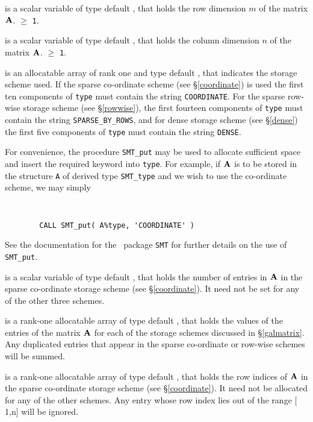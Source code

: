 \documentclass{galahad}
\begin{document}
\begin{description}

 is a scalar variable of type default \integer, that holds
the row dimension $m$ of the matrix  ${\mathbf{A}}$. 
 $\geq$ {\tt 1}. 

 is a scalar variable of type default \integer, that holds
the column dimension $n$ of the matrix  ${\mathbf{A}}$. 
 $\geq$ {\tt 1}. 

 is an allocatable array of rank one and type default \character, that
indicates the storage scheme used. If the 
sparse co-ordinate scheme (see \S\ref{coordinate}) is used
the first ten components of {\tt type} must contain the
string {\tt COORDINATE}.
For the sparse row-wise storage scheme (see \S\ref{rowwise}),
the first fourteen components of {\tt type} must contain the
string {\tt SPARSE\_BY\_ROWS}, and
for dense storage scheme (see \S\ref{dense})
the first five components of {\tt type} must contain the
string {\tt DENSE}.

For convenience, the procedure {\tt SMT\_put} 
may be used to allocate sufficient space and insert the required keyword
into {\tt type}.
For example, if ${\mathbf{A}}$ is to be stored in the structure {\tt A} 
of derived type {\tt SMT\_type} and we wish to use
the co-ordinate scheme, we may simply
{\tt 
\begin{verbatim}
        CALL SMT_put( A%type, 'COORDINATE' )
\end{verbatim}
}
\noindent
See the documentation for the \galahad\ package {\tt SMT} 
for further details on the use of {\tt SMT\_put}.

 is a scalar variable of type default \integer, that 
holds the number of entries in ${\mathbf{A}}$
in the sparse co-ordinate storage scheme (see \S\ref{coordinate}). 
It need not be set for any of the other three schemes.

 is a rank-one allocatable array of type default \realdp, that holds
the values of the entries of the matrix ${\mathbf{A}}$ for each of the 
storage schemes discussed in \S\ref{galmatrix}.
Any duplicated entries that appear in the sparse 
co-ordinate or row-wise schemes will be summed.

 is a rank-one allocatable array of type default \integer,
that holds the row indices of ${\mathbf{A}}$ in the sparse co-ordinate storage
scheme (see \S\ref{coordinate}). 
It need not be allocated for any of the other schemes.
Any entry whose row index lies out of the range $[$1,n$]$ will be ignored.


\end{description}
\end{document}
